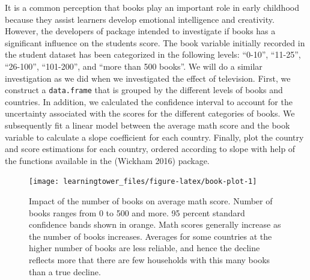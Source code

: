 It is a common perception that books play an important role in early childhood because they assist learners develop emotional intelligence and creativity. However, the developers of  package intended to investigate if books has a significant influence on the students score. The book variable initially recorded in the student dataset has been categorized in the following levels: ``0-10'', ``11-25'', ``26-100'', ``101-200'', and ``more than 500 books''. We will do a similar investigation as we did when we investigated the effect of television. First, we construct a \texttt{data.frame} that is grouped by the different levels of books and countries. In addition, we calculated the confidence interval to account for the uncertainty associated with the scores for the different categories of books. We subsequently fit a linear model between the average math score and the book variable to calculate a slope coefficient for each country. Finally, plot the country and score estimations for each country, ordered according to slope with help of the functions available in the  (Wickham 2016) package.

\begin{figure}[H]
\texttt{[image: learningtower\_files/figure-latex/book-plot-1]} \caption{Impact of the number of books on average math score. Number of books ranges from 0 to 500 and more. 95 percent standard confidence bands shown in orange. Math scores generally increase as the number of books increases. Averages for some countries at the higher number of books are less reliable, and hence the decline reflects more that there are few households with this many books than a true decline.}\label{fig:book-plot}
\end{figure}

